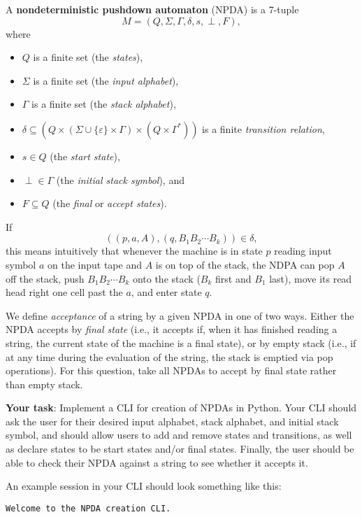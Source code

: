 \documentclass[addpoints]{exam}
\begin{document}
\begin{questions}
A \textbf{nondeterministic pushdown automaton} (NPDA) is a 7-tuple $$M = (Q, \Sigma, \Gamma, \delta, s, \perp, F),$$ where

\begin{itemize}
    \item $Q$ is a finite set (the \emph{states}),
    \item $\Sigma$ is a finite set (the \emph{input alphabet}),
    \item $\Gamma$ is a finite set (the \emph{stack alphabet}),
    \item $\delta \subseteq (Q\times (\Sigma \cup \{\varepsilon\} \times \Gamma) \times (Q\times \Gamma^*))$ is a finite \emph{transition relation},
    \item $s\in Q$ (the \emph{start state}),
    \item $\perp \in \Gamma$ (the \emph{initial stack symbol}), and 
    \item $F \subseteq Q$ (the \emph{final} or \emph{accept states}).
\end{itemize}

If $$((p, a, A), (q, B_1 B_2 \cdots B_k)) \in \delta,$$ this means intuitively that whenever the machine is in state $p$ reading input symbol $a$ on the input tape and $A$ is on top of the stack, the NDPA can pop $A$ off the stack, push $B_1 B_2 \cdots B_k$ onto the stack ($B_k$ first and $B_1$ last), move its read head right one cell past the $a$, and enter state $q$. 

We define \emph{acceptance} of a string by a given NPDA in one of two ways. Either the NPDA accepts by \emph{final state} (i.e., it accepts if, when it has finished reading a string, the current state of the machine is a final state), or by empty stack (i.e., if at any time during the evaluation of the string, the stack is emptied via pop operations). For this question, take all NPDAs to accept by final state rather than empty stack.

\textbf{Your task}: Implement a CLI for creation of NPDAs in Python. Your CLI should ask the user for their desired input alphabet, stack alphabet, and initial stack symbol, and should allow users to add and remove states and transitions, as well as declare states to be start states and/or final states. Finally, the user should be able to check their NPDA against a string to see whether it accepts it.

An example session in your CLI should look something like this:

\begin{verbatim}
Welcome to the NPDA creation CLI.


\end{verbatim}
\end{questions}
\end{document}
